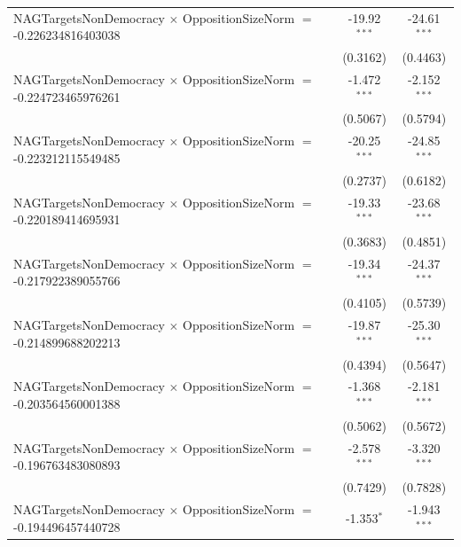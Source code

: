 \begin{tabular}{lcc}
   NAGTargetsNonDemocracy $\times$ OppositionSizeNorm $=$ -0.226234816403038    & -19.92$^{***}$       & -24.61$^{***}$\\   
                                                                                & (0.3162)             & (0.4463)\\   
   NAGTargetsNonDemocracy $\times$ OppositionSizeNorm $=$ -0.224723465976261    & -1.472$^{***}$       & -2.152$^{***}$\\   
                                                                                & (0.5067)             & (0.5794)\\   
   NAGTargetsNonDemocracy $\times$ OppositionSizeNorm $=$ -0.223212115549485    & -20.25$^{***}$       & -24.85$^{***}$\\   
                                                                                & (0.2737)             & (0.6182)\\   
   NAGTargetsNonDemocracy $\times$ OppositionSizeNorm $=$ -0.220189414695931    & -19.33$^{***}$       & -23.68$^{***}$\\   
                                                                                & (0.3683)             & (0.4851)\\   
   NAGTargetsNonDemocracy $\times$ OppositionSizeNorm $=$ -0.217922389055766    & -19.34$^{***}$       & -24.37$^{***}$\\   
                                                                                & (0.4105)             & (0.5739)\\   
   NAGTargetsNonDemocracy $\times$ OppositionSizeNorm $=$ -0.214899688202213    & -19.87$^{***}$       & -25.30$^{***}$\\   
                                                                                & (0.4394)             & (0.5647)\\   
   NAGTargetsNonDemocracy $\times$ OppositionSizeNorm $=$ -0.203564560001388    & -1.368$^{***}$       & -2.181$^{***}$\\   
                                                                                & (0.5062)             & (0.5672)\\   
   NAGTargetsNonDemocracy $\times$ OppositionSizeNorm $=$ -0.196763483080893    & -2.578$^{***}$       & -3.320$^{***}$\\   
                                                                                & (0.7429)             & (0.7828)\\   
   NAGTargetsNonDemocracy $\times$ OppositionSizeNorm $=$ -0.194496457440728    & -1.353$^{*}$         & -1.943$^{***}$\\   

\end{tabular}
